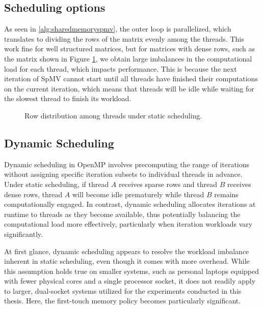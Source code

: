 \subsection{Scheduling options}
\label{sec:schedulingoptions}
As seen in \autoref{alg:sharedmemoryspmv}, the outer loop is parallelized, which translates to dividing the rows of the matrix evenly among the threads. This work fine for well structured matrices, but for matrices with dense rows, such as the matrix shown in Figure \ref{fig:staticscheduling}, we obtain large imbalances in the computational load for each thread, which impacts performance. This is because the next iteration of SpMV cannot start until all threads have finished their computations on the current iteration, which means that threads will be idle while waiting for the slowest thread to finish its workload.

\begin{figure}[H]
    \centering
    \caption{Row distribution among threads under static scheduling.}
    \label{fig:staticscheduling}
\end{figure}

\subsection{Dynamic Scheduling}

Dynamic scheduling in OpenMP involves precomputing the range of iterations without assigning specific iteration subsets to individual threads in advance. Under static scheduling, if thread \(A\) receives sparse rows and thread \(B\) receives dense rows, thread \(A\) will become idle prematurely while thread \(B\) remains computationally engaged. In contrast, dynamic scheduling allocates iterations at runtime to threads as they become available, thus potentially balancing the computational load more effectively, particularly when iteration workloads vary significantly.

At first glance, dynamic scheduling appears to resolve the workload imbalance inherent in static scheduling, even though it comes with more overhead. While this assumption holds true on smaller systems, such as personal laptops equipped with fewer physical cores and a single processor socket, it does not readily apply to larger, dual-socket systems utilized for the experiments conducted in this thesis. Here, the first-touch memory policy becomes particularly significant.


